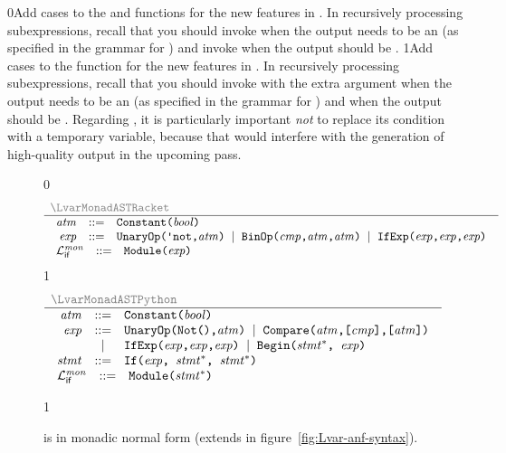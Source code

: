 \documentclass[7x10]{TimesAPriori_MIT}%
\newcommand{\gray}[1]{{\color{gray} #1}}
\def\racketEd{0}
\def\pythonEd{1}
\def\edition{1}
\newcommand{\racket}[1]{{\if\edition\racketEd{#1}\fi}}
\newcommand{\pythonColor}[0]{}
\newcommand{\python}[1]{{\if\edition\pythonEd\pythonColor #1\fi}}
\numberwithin{theorem}{chapter}
\numberwithin{definition}{chapter}
\numberwithin{equation}{chapter}
\begin{document}
\racket{Add cases to the  and 
  functions for the new features in \LangIf{}. In recursively
  processing subexpressions, recall that you should invoke
  \code{rco\_atom} when the output needs to be an \Atm{} (as specified
  in the grammar for \LangIfANF{}) and invoke  when the
  output should be \Exp{}.}
%
\python{Add cases to the \code{rco\_exp} function for the new features
  in \LangIf{}. In recursively processing subexpressions, recall that
  you should invoke \code{rco\_exp} with the extra argument
  \code{True} when the output needs to be an \Atm{} (as specified in
  the grammar for \LangIfANF{}) and \code{False} when the output
  should be \Exp{}.}
%
Regarding , it is particularly important \emph{not} to
replace its condition with a temporary variable, because that would
interfere with the generation of high-quality output in the upcoming
 pass.

\newcommand{\LifMonadASTRacket}{
\begin{array}{rcl}
\Atm &::=& \BOOL{\itm{bool}}\\
\Exp &::=& \UNIOP{\key{\textquotesingle not}}{\Atm} 
     \MID \BINOP{\itm{cmp}}{\Atm}{\Atm} 
     \MID \IF{\Exp}{\Exp}{\Exp} 
\end{array}
}
  
\newcommand{\LifMonadASTPython}{
\begin{array}{rcl}
\Atm &::=& \BOOL{\itm{bool}}\\
\Exp &::=& \UNIOP{\key{Not()}}{\Atm}
           \MID \CMP{\Atm}{\itm{cmp}}{\Atm} \\
   &\MID& \IF{\Exp}{\Exp}{\Exp} 
    \MID \BEGIN{\Stmt^{*}}{\Exp}\\
\Stmt{} &::=& \IFSTMT{\Exp}{\Stmt^{*}}{\Stmt^{*}}
\end{array}
}

\begin{figure}[tp]
\centering
\begin{tcolorbox}[colback=white]
{\if\edition\racketEd    
\[
\begin{array}{l}
  \gray{\LvarMonadASTRacket} \\ \hline
  \LifMonadASTRacket \\
\begin{array}{rcl}
\LangIfANF  &::=& \PROGRAM{\code{()}}{\Exp}
\end{array}
\end{array}
\]
\fi}
{\if\edition\pythonEd\pythonColor
\[
\begin{array}{l}
  \gray{\LvarMonadASTPython} \\ \hline
  \LifMonadASTPython \\
   \begin{array}{rcl}
     \LangIfANF  &::=& \PROGRAM{\code{()}}{\Stmt^{*}}
   \end{array}
\end{array}
\]
\fi}
\end{tcolorbox}
\python{}
\caption{\LangIfANF{} is \LangIf{} in monadic normal form
  (extends \LangVarANF in figure~\ref{fig:Lvar-anf-syntax}).}
\label{fig:Lif-anf-syntax}
\end{figure}
\end{document}
